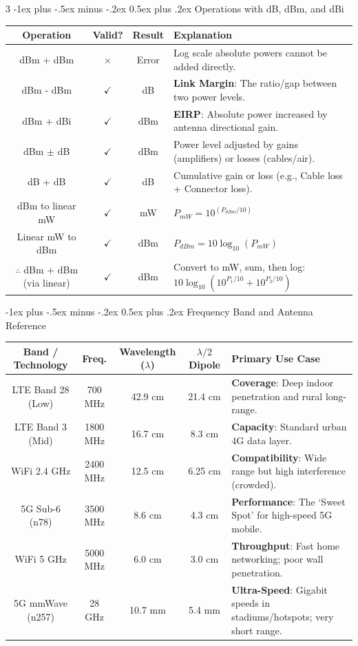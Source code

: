 \documentclass[a4paper, 9pt, landscape]{extarticle}
\makeatletter
\renewcommand{\subsubsection}{\@startsection{paragraph}{4}{0mm}%
                                {-1ex plus -.5ex minus -.2ex}%
                                {0.5ex plus .2ex}%
                                {\normalfont\footnotesize\bfseries}}
\makeatother
\begin{document}
\begin{multicols*}{3}
\subsubsection{Operations with dB, dBm, and dBi}
{
\tiny 
\begin{tabularx}{\columnwidth}{|c|c|c|X|}
\hline
\rowcolor{lightgray}\textbf{Operation} & \textbf{Valid?} & \textbf{Result} & \textbf{Explanation} \\
\hline
dBm + dBm & $\times$ & Error & Log scale absolute powers cannot be added directly. \\
\hline
dBm - dBm & $\checkmark$ & dB & \textbf{Link Margin}: The ratio/gap between two power levels. \\
\hline
dBm + dBi & $\checkmark$ & dBm & \textbf{EIRP}: Absolute power increased by antenna directional gain. \\
\hline
dBm $\pm$ dB & $\checkmark$ & dBm & Power level adjusted by gains (amplifiers) or losses (cables/air). \\
\hline
dB + dB & $\checkmark$ & dB & Cumulative gain or loss (e.g., Cable loss + Connector loss). \\
\hline
dBm to linear mW & $\checkmark$ & mW & $P_{mW} = 10^{(P_{dBm}/10)}$ \\
\hline
Linear mW to dBm & $\checkmark$ & dBm & $P_{dBm} = 10 \log_{10}(P_{mW})$ \\
\hline
$\therefore$ dBm + dBm (via linear) & $\checkmark$ & dBm & Convert to mW, sum, then log: \newline $10 \log_{10}(10^{P_1/10} + 10^{P_2/10})$ \\
\hline
\end{tabularx}
}

\subsubsection{Frequency Band and Antenna Reference}
{
\tiny 
\begin{tabularx}{\columnwidth}{|c|c|c|c|X|}
\hline
\rowcolor{lightgray}\textbf{Band / Technology} & \textbf{Freq.} & \textbf{Wavelength ($\lambda$)} & \textbf{$\lambda/2$ Dipole} & \textbf{Primary Use Case} \\
\hline
LTE Band 28 (Low) & 700 MHz & 42.9 cm & 21.4 cm & \textbf{Coverage}: Deep indoor penetration and rural long-range. \\
\hline
LTE Band 3 (Mid) & 1800 MHz & 16.7 cm & 8.3 cm & \textbf{Capacity}: Standard urban 4G data layer. \\
\hline
WiFi 2.4 GHz & 2400 MHz & 12.5 cm & 6.25 cm & \textbf{Compatibility}: Wide range but high interference (crowded). \\
\hline
5G Sub-6 (n78) & 3500 MHz & 8.6 cm & 4.3 cm & \textbf{Performance}: The `Sweet Spot' for high-speed 5G mobile. \\
\hline
WiFi 5 GHz & 5000 MHz & 6.0 cm & 3.0 cm & \textbf{Throughput}: Fast home networking; poor wall penetration. \\
\hline
5G mmWave (n257) & 28 GHz & 10.7 mm & 5.4 mm & \textbf{Ultra-Speed}: Gigabit speeds in stadiums/hotspots; very short range. \\
\hline
\end{tabularx}
}


\end{multicols*}
\end{document}
